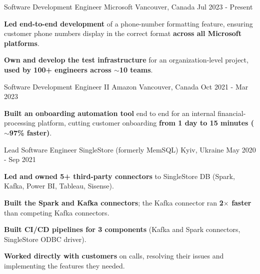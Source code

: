 \begin{cventries}

\cventry
    {Software Development Engineer} %
    {Microsoft} %
    {Vancouver, Canada} %
    {Jul 2023 - Present} %
    {
      \begin{cvitems} %
        \item { \textbf{Led end-to-end development} of a phone-number formatting feature, ensuring customer phone numbers display in the correct format \textbf{across all Microsoft platforms}. }
        \item { \textbf{Own and develop the test infrastructure} for an organization-level project, \textbf{used by 100+ engineers across $\sim$10 teams}. }
      \end{cvitems}
    }

\cventry
    {Software Development Engineer II} %
    {Amazon} %
    {Vancouver, Canada} %
    {Oct 2021 - Mar 2023} %
    {
      \begin{cvitems} %
        \item { \textbf{Built an onboarding automation tool} end to end for an internal financial-processing platform, cutting customer onboarding \textbf{from 1 day to 15 minutes ($\sim$97\% faster)}. }
      \end{cvitems}
    }

\cventry
    {Lead Software Engineer} %
    {SingleStore (formerly MemSQL)} %
    {Kyiv, Ukraine} %
    {May 2020 - Sep 2021} %
    {
      \begin{cvitems} %
        \item { \textbf{Led and owned 5+ third-party connectors} to SingleStore DB (Spark, Kafka, Power BI, Tableau, Sisense). }
        \item { \textbf{Built the Spark and Kafka connectors}; the Kafka connector ran \textbf{2$\times$ faster} than competing Kafka connectors. }
        \item { \textbf{Built CI/CD pipelines for 3 components} (Kafka and Spark connectors, SingleStore ODBC driver). }
        \item { \textbf{Worked directly with customers} on calls, resolving their issues and implementing the features they needed. }
      \end{cvitems}
    }


\end{cventries}

